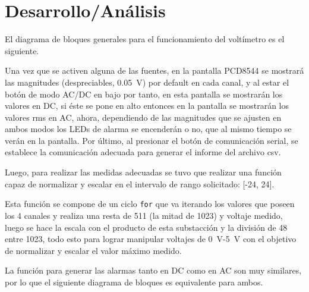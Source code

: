 \section{Desarrollo/Análisis}
El diagrama de bloques generales para el funcionamiento del voltímetro es el siguiente.

Una vez que se activen alguna de las fuentes, en la pantalla PCD8544 se mostrará las magnitudes (despreciables, \SI{0.05}{\volt}) por default en cada canal, y al estar el botón de modo AC/DC en bajo por tanto, en esta pantalla se mostrarán los valores en DC, si éste se pone en alto entonces en la pantalla se mostrarán los valores rms en AC, ahora, dependiendo de las magnitudes que se ajusten en ambos modos los LEDs de alarma se encenderán o no, que al mismo tiempo se verán en la pantalla. Por último, al presionar el botón de comunicación serial, se establece la comunicación adecuada para generar el informe del archivo csv.\par
Luego, para realizar las medidas adecuadas se tuvo que realizar una función capaz de normalizar y escalar en el intervalo de rango solicitado: [-24, 24]. 

Esta función se compone de un ciclo \texttt{for} que va iterando los valores que poseen los 4 canales y realiza una resta de 511 (la mitad de 1023) y voltaje medido, luego se hace la escala con el producto de esta substacción y la división de 48 entre 1023, todo esto para lograr manipular voltajes de \SI{0}{\volt}-\SI{5}{\volt} con el objetivo de normalizar y escalar el valor máximo medido.\par
La función para generar las alarmas tanto en DC como en AC son muy similares, por lo que el siguiente diagrama de bloques es equivalente para ambos.


